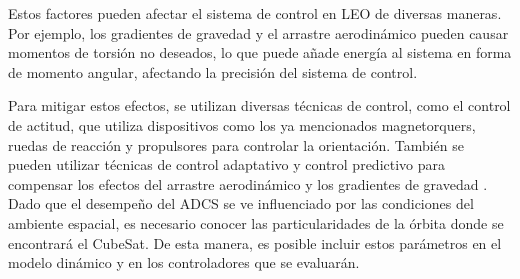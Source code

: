 Estos factores pueden afectar el sistema de control en LEO de diversas maneras. Por ejemplo, los gradientes de gravedad y el arrastre aerodinámico pueden causar momentos de torsión no deseados, lo que puede añade energía al sistema en forma de momento angular, afectando la precisión del sistema de control.
 
Para mitigar estos efectos, se utilizan diversas técnicas de control, como el control de actitud, que utiliza dispositivos como los ya mencionados magnetorquers, ruedas de reacción y propulsores para controlar la orientación. También se pueden utilizar técnicas de control adaptativo y control predictivo para compensar los efectos del arrastre aerodinámico y los gradientes de gravedad \cite{Junkins1997}.
Dado que el desempeño del ADCS se ve influenciado por las condiciones del ambiente espacial, es necesario conocer las particularidades de la órbita donde se encontrará el CubeSat. De esta manera, es posible incluir estos parámetros en el modelo dinámico y en los controladores que se evaluarán. 


